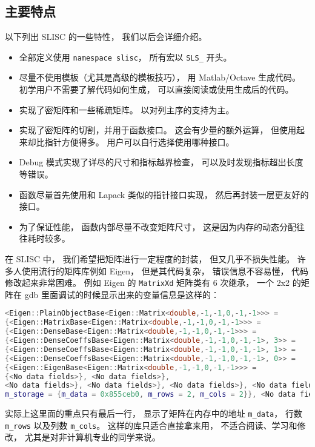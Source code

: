 \subsection{主要特点}
以下列出 SLISC 的一些特性， 我们以后会详细介绍。
\begin{itemize}
\item 全部定义使用 \verb|namespace slisc|， 所有宏以 \verb|SLS_| 开头。
\item 尽量不使用模板（尤其是高级的模板技巧）， 用 Matlab/Octave 生成代码。 初学用户不需要了解代码如何生成， 可以直接阅读或使用生成后的代码。
\item 实现了密矩阵和一些稀疏矩阵。 以对列主序的支持为主。
\item 实现了密矩阵的切割，并用于函数接口。 这会有少量的额外运算， 但使用起来却比指针方便得多。 用户可以自行选择使用哪种接口。
\item Debug 模式实现了详尽的尺寸和指标越界检查， 可以及时发现指标超出长度等错误。
\item 函数尽量首先使用和 Lapack 类似的指针接口实现， 然后再封装一层更友好的接口。
\item 为了保证性能， 函数内部尽量不改变矩阵尺寸， 这是因为内存的动态分配往往耗时较多。
\end{itemize}

在 SLISC 中， 我们希望把矩阵进行一定程度的封装， 但又几乎不损失性能。 许多人使用流行的矩阵库例如 Eigen， 但是其代码复杂， 错误信息不容易懂， 代码修改起来非常困难。 例如 Eigen 的 \verb|MatrixXd| 矩阵类有 6 次继承， 一个 2x2 的矩阵在 gdb 里面调试的时候显示出来的变量信息是这样的：
\begin{lstlisting}[language=cpp]
<Eigen::PlainObjectBase<Eigen::Matrix<double,-1,-1,0,-1,-1>>> = 
{<Eigen::MatrixBase<Eigen::Matrix<double,-1,-1,0,-1,-1>>> = 
{<Eigen::DenseBase<Eigen::Matrix<double,-1,-1,0,-1,-1>>> = 
{<Eigen::DenseCoeffsBase<Eigen::Matrix<double,-1,-1,0,-1,-1>, 3>> = 
{<Eigen::DenseCoeffsBase<Eigen::Matrix<double,-1,-1,0,-1,-1>, 1>> = 
{<Eigen::DenseCoeffsBase<Eigen::Matrix<double,-1,-1,0,-1,-1>, 0>> = 
{<Eigen::EigenBase<Eigen::Matrix<double,-1,-1,0,-1,-1>>> =
{<No data fields>}, <No data fields>}, 
<No data fields>}, <No data fields>}, <No data fields>}, <No data fields>},
m_storage = {m_data = 0x855ceb0, m_rows = 2, m_cols = 2}}, <No data fields>
\end{lstlisting}
实际上这里面的重点只有最后一行， 显示了矩阵在内存中的地址 \verb|m_data|， 行数 \verb|m_rows| 以及列数 \verb|m_cols|。 这样的库只适合直接拿来用， 不适合阅读、学习和修改， 尤其是对非计算机专业的同学来说。

